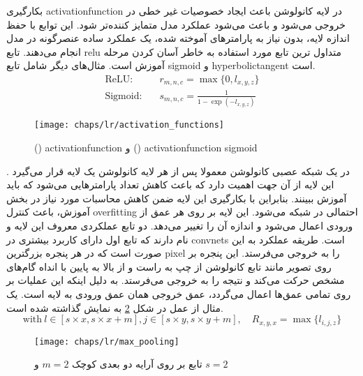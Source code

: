 بکارگیری \gls{activationfunction} در لایه کانولوشن باعث ایجاد خصوصیات غیر خطی در خروجی می‌شود و باعث می‌شود عملکرد مدل متمایز کننده‌تر شود. این توابع با حفظ اندازه لایه، بدون نیاز به پارامترهای آموخته شده، یک عملكرد ساده عنصرگونه در مدل انجام می‌دهند. تابع \gls{relu} متداول ترین تابع مورد استفاده به خاطر آسان کردن مرحله آموزش است. مثال‌های دیگر شامل تابع \gls{sigmoid} و \gls{hyperbolictangent} است.
\begin{equation}
	\begin{aligned}
		\text{ReLU:}&\quad r_{m,n,c} = \max\{0,l_{x,y,z}\} \\
		\text{Sigmoid:}&\quad s_{m,n,c} = \frac{1}{1-\exp(-l_{x,y,z})}
	\end{aligned}
	\label{eq:ch_lr:relu-sigmoid}
\end{equation}
\begin{figure}[!ht]
	\centerline{\texttt{[image: chaps/lr/activation\_functions]}}
	\caption{() \gls{activationfunction}  و () \gls{activationfunction} \gls{sigmoid}	
	}
	\label{fig:ch_lr:activation_functions}
\end{figure}
در یک شبکه عصبی کانولوشن معمولا پس از هر لایه کانولوشن یک لایه  قرار می‌گیرد . این لایه‌ از آن جهت اهمیت دارد که باعث کاهش تعداد پارامترهایی می‌شود که باید آموزش ببینند. بنابراین با بکارگیری این لایه ضمن کاهش محاسبات مورد نیاز در بخش آموزش، باعث کنترل \gls{overfitting} احتمالی در شبکه می‌شود. این لایه بر روی هر عمق از ورودی اعمال می‌شود و اندازه آن را تغییر می‌دهد. دو تابع عملکردی معروف این لایه  و  نام دارند که تابع اول دارای کاربرد بیشتری در \glspl{convnet} است. طریقه عملکرد  به این صورت است که در هر پنجره بزرگترین \gls{pixel} را به خروجی می‌فرستد. این پنجره بر روی تصویر مانند تابع کانولوشن از چپ به راست و از بالا به پایین با انداه گام‌های مشخص حرکت می‌کند و نتیجه را به خروجی می‌فرستد. به دلیل اینکه این عملیات بر روی تمامی عمق‌ها اعمال می‌گردد، عمق خروجی همان عمق ورودی به لایه  است. یک مثال از عمل  در شکل \ref{fig:ch_lr:max_pooling} به نمایش گذاشته شده است.
\begin{equation}
	\text{with}\ l \in [s\times x, s\times x + m], j\in [s\times y, s\times y + m], \quad R_{x,y,x} = \max \{l_{i,j,z}\}
	\label{eq:ch_lr:max-pooling}
\end{equation}
\begin{figure}[!ht]
	\centerline{\texttt{[image: chaps/lr/max\_pooling]}}
	\caption{
		تابع  بر روی آرایه دو بعدی کوچک $m=2$ و $s=2$
	}
	\label{fig:ch_lr:max_pooling}
\end{figure}
